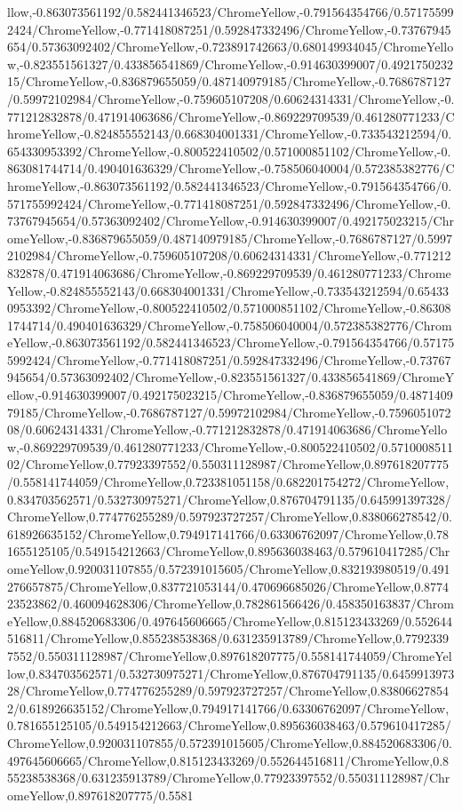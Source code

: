 {\begin{tikzternal}
{llow,-0.863073561192/0.582441346523/ChromeYellow,-0.791564354766/0.571755992424/ChromeYellow,-0.771418087251/0.592847332496/ChromeYellow,-0.73767945654/0.57363092402/ChromeYellow,-0.723891742663/0.680149934045/ChromeYellow,-0.823551561327/0.433856541869/ChromeYellow,-0.914630399007/0.492175023215/ChromeYellow,-0.836879655059/0.487140979185/ChromeYellow,-0.7686787127/0.59972102984/ChromeYellow,-0.759605107208/0.60624314331/ChromeYellow,-0.771212832878/0.471914063686/ChromeYellow,-0.869229709539/0.461280771233/ChromeYellow,-0.824855552143/0.668304001331/ChromeYellow,-0.733543212594/0.654330953392/ChromeYellow,-0.800522410502/0.571000851102/ChromeYellow,-0.863081744714/0.490401636329/ChromeYellow,-0.758506040004/0.572385382776/ChromeYellow,-0.863073561192/0.582441346523/ChromeYellow,-0.791564354766/0.571755992424/ChromeYellow,-0.771418087251/0.592847332496/ChromeYellow,-0.73767945654/0.57363092402/ChromeYellow,-0.914630399007/0.492175023215/ChromeYellow,-0.836879655059/0.487140979185/ChromeYellow,-0.7686787127/0.59972102984/ChromeYellow,-0.759605107208/0.60624314331/ChromeYellow,-0.771212832878/0.471914063686/ChromeYellow,-0.869229709539/0.461280771233/ChromeYellow,-0.824855552143/0.668304001331/ChromeYellow,-0.733543212594/0.654330953392/ChromeYellow,-0.800522410502/0.571000851102/ChromeYellow,-0.863081744714/0.490401636329/ChromeYellow,-0.758506040004/0.572385382776/ChromeYellow,-0.863073561192/0.582441346523/ChromeYellow,-0.791564354766/0.571755992424/ChromeYellow,-0.771418087251/0.592847332496/ChromeYellow,-0.73767945654/0.57363092402/ChromeYellow,-0.823551561327/0.433856541869/ChromeYellow,-0.914630399007/0.492175023215/ChromeYellow,-0.836879655059/0.487140979185/ChromeYellow,-0.7686787127/0.59972102984/ChromeYellow,-0.759605107208/0.60624314331/ChromeYellow,-0.771212832878/0.471914063686/ChromeYellow,-0.869229709539/0.461280771233/ChromeYellow,-0.800522410502/0.571000851102/ChromeYellow,0.77923397552/0.550311128987/ChromeYellow,0.897618207775/0.558141744059/ChromeYellow,0.723381051158/0.682201754272/ChromeYellow,0.834703562571/0.532730975271/ChromeYellow,0.876704791135/0.645991397328/ChromeYellow,0.774776255289/0.597923727257/ChromeYellow,0.838066278542/0.618926635152/ChromeYellow,0.794917141766/0.63306762097/ChromeYellow,0.781655125105/0.549154212663/ChromeYellow,0.895636038463/0.579610417285/ChromeYellow,0.920031107855/0.572391015605/ChromeYellow,0.832193980519/0.491276657875/ChromeYellow,0.837721053144/0.470696685026/ChromeYellow,0.877423523862/0.460094628306/ChromeYellow,0.782861566426/0.458350163837/ChromeYellow,0.884520683306/0.497645606665/ChromeYellow,0.815123433269/0.552644516811/ChromeYellow,0.855238538368/0.631235913789/ChromeYellow,0.77923397552/0.550311128987/ChromeYellow,0.897618207775/0.558141744059/ChromeYellow,0.834703562571/0.532730975271/ChromeYellow,0.876704791135/0.645991397328/ChromeYellow,0.774776255289/0.597923727257/ChromeYellow,0.838066278542/0.618926635152/ChromeYellow,0.794917141766/0.63306762097/ChromeYellow,0.781655125105/0.549154212663/ChromeYellow,0.895636038463/0.579610417285/ChromeYellow,0.920031107855/0.572391015605/ChromeYellow,0.884520683306/0.497645606665/ChromeYellow,0.815123433269/0.552644516811/ChromeYellow,0.855238538368/0.631235913789/ChromeYellow,0.77923397552/0.550311128987/ChromeYellow,0.897618207775/0.5581}
\end{tikzternal}}
